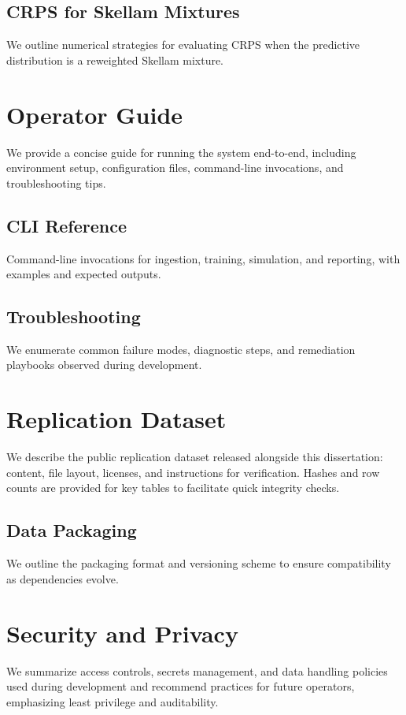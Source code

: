 \documentclass[12pt]{report}  %
\numberwithin{equation}{section}
\theoremstyle{plain}
\theoremstyle{definition}
\theoremstyle{remark}
\begin{document}
\section{CRPS for Skellam Mixtures}
We outline numerical strategies for evaluating CRPS when the predictive distribution is a reweighted Skellam mixture.

\chapter{Operator Guide}
We provide a concise guide for running the system end-to-end, including environment setup, configuration files, command-line invocations, and troubleshooting tips.

\section{CLI Reference}
Command-line invocations for ingestion, training, simulation, and reporting, with examples and expected outputs.

\section{Troubleshooting}
We enumerate common failure modes, diagnostic steps, and remediation playbooks observed during development.

\chapter{Replication Dataset}
We describe the public replication dataset released alongside this dissertation: content, file layout, licenses, and instructions for verification. Hashes and row counts are provided for key tables to facilitate quick integrity checks.

\section{Data Packaging}
We outline the packaging format and versioning scheme to ensure compatibility as dependencies evolve.

\chapter{Security and Privacy}
We summarize access controls, secrets management, and data handling policies used during development and recommend practices for future operators, emphasizing least privilege and auditability.
\end{document}
